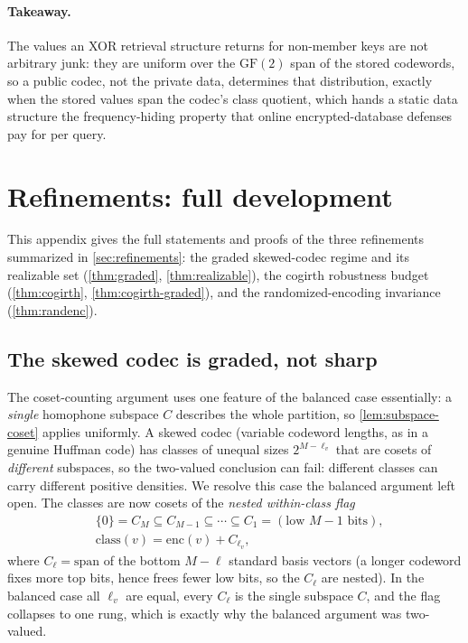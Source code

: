 \documentclass[sigconf,nonacm,anonymous,balance=false]{acmart}
\newcommand{\enc}{\mathrm{enc}}
\newcommand{\GF}{\mathrm{GF}(2)}
\newcommand{\spn}{\mathrm{span}}
\newcommand{\class}{\mathrm{class}}
\begin{document}
\paragraph{Takeaway.}
The values an XOR retrieval structure returns for non-member keys are not arbitrary junk: they are
uniform over the $\GF$ span of the stored codewords, so a public codec, not the private data,
determines that distribution, exactly when the stored values span the codec's class quotient,
which hands a static data structure the frequency-hiding property that online encrypted-database
defenses pay for per query.

\appendix

\section{Refinements: full development}
\label{app:refinements}

This appendix gives the full statements and proofs of the three refinements summarized
in \cref{sec:refinements}: the graded skewed-codec regime and its realizable set
(\cref{thm:graded}, \cref{thm:realizable}), the cogirth robustness budget
(\cref{thm:cogirth}, \cref{thm:cogirth-graded}), and the randomized-encoding invariance
(\cref{thm:randenc}).

\subsection{The skewed codec is graded, not sharp}
\label{sec:t4b}

The coset-counting argument uses one feature of the balanced case essentially: a
\emph{single} homophone subspace $C$ describes the whole partition, so
\cref{lem:subspace-coset} applies uniformly. A skewed codec (variable codeword lengths,
as in a genuine Huffman code) has classes of unequal sizes $2^{M - \ell_v}$ that are
cosets of \emph{different} subspaces, so the two-valued conclusion can fail: different
classes can carry different positive densities. We resolve this case the balanced
argument left open. The classes are now cosets of the \emph{nested within-class flag}
\[
  \begin{aligned}
  &\{0\} = C_M \subseteq C_{M-1} \subseteq \cdots \subseteq C_1 = (\text{low } M-1 \text{ bits}),\\
  &\class(v) = \enc(v) + C_{\ell_v},
  \end{aligned}
\]
where $C_\ell = \spn$ of the bottom $M - \ell$ standard basis vectors (a longer codeword
fixes more top bits, hence frees fewer low bits, so the $C_\ell$ are nested). In the
balanced case all $\ell_v$ are equal, every $C_\ell$ is the single subspace $C$, and the
flag collapses to one rung, which is exactly why the balanced argument was two-valued.
\end{document}
